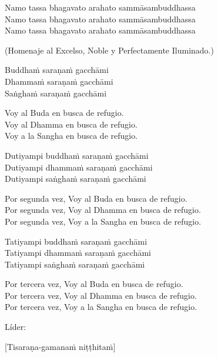Namo tassa bhagavato arahato sammāsambuddhassa\\
Namo tassa bhagavato arahato sammāsambuddhassa\\
Namo tassa bhagavato arahato sammāsambuddhassa

\begin{english}
 (Homenaje al Excelso, Noble y Perfectamente Iluminado.)\\
\end{english}

Buddhaṁ saraṇaṁ gacchāmi\\
Dhammaṁ saraṇaṁ gacchāmi\\
Saṅghaṁ saraṇaṁ gacchāmi

\begin{english}
  Voy al Buda en busca de refugio.\\
  Voy al Dhamma en busca de refugio.\\
  Voy a la Sangha en busca de refugio.
\end{english}

Dutiyampi buddhaṁ saraṇaṁ gacchāmi\\
Dutiyampi dhammaṁ saraṇaṁ gacchāmi\\
Dutiyampi saṅghaṁ saraṇaṁ gacchāmi

\begin{english}
  Por segunda vez, Voy al Buda en busca de refugio.\\
  Por segunda vez, Voy al Dhamma en busca de refugio.\\
  Por segunda vez, Voy a la Sangha en busca de refugio.
\end{english}

Tatiyampi buddhaṁ saraṇaṁ gacchāmi\\
Tatiyampi dhammaṁ saraṇaṁ gacchāmi\\
Tatiyampi saṅghaṁ saraṇaṁ gacchāmi

\clearpage

\begin{english}
  Por tercera vez, Voy al Buda en busca de refugio.\\
  Por tercera vez, Voy al Dhamma en busca de refugio.\\
  Por tercera vez, Voy a la Sangha en busca de refugio.
\end{english}

\begin{instruction}
  Líder:
\end{instruction}

[Tisaraṇa-gamanaṁ niṭṭhitaṁ]

